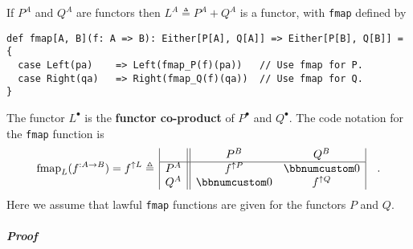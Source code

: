 If $P^{A}$ and $Q^{A}$ are functors then $L^{A}\triangleq P^{A}+Q^{A}$
is a functor, with \lstinline!fmap! defined by
\begin{lstlisting}
def fmap[A, B](f: A => B): Either[P[A], Q[A]] => Either[P[B], Q[B]] = {
  case Left(pa)    => Left(fmap_P(f)(pa))   // Use fmap for P.
  case Right(qa)   => Right(fmap_Q(f)(qa))  // Use fmap for Q.
}
\end{lstlisting}
The functor $L^{\bullet}$ is the \textbf{functor co-product}
of $P^{\bullet}$ and $Q^{\bullet}$. The code notation for the \lstinline!fmap!
function is
\[
\text{fmap}_{L}(f^{:A\rightarrow B})=f^{\uparrow L}\triangleq\,\begin{array}{|c||cc|}
 & P^{B} & Q^{B}\\
\hline P^{A} & f^{\uparrow P} & \bbnum 0\\
Q^{A} & \bbnum 0 & f^{\uparrow Q}
\end{array}\quad.
\]
Here we assume that lawful \lstinline!fmap! functions are given for
the functors $P$ and $Q$.

\subparagraph{Proof}

